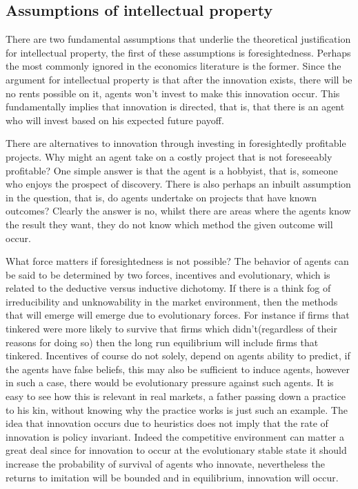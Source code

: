 \documentclass[12pt]{article}
\numberwithin{equation}{section}
\begin{document}
\subsection{Assumptions of intellectual property}


There are two fundamental assumptions that underlie the theoretical justification for intellectual property, the first of these assumptions is foresightedness. Perhaps the most commonly ignored in the economics literature is the former. Since the argument for intellectual property is that after the innovation exists, there will be no rents possible on it, agents won't invest to make this innovation occur. This fundamentally implies that innovation is directed, that is, that there is an agent who will invest based on his expected future payoff.

There are alternatives to innovation through investing in foresightedly profitable projects. Why might an agent take on a costly project that is not foreseeably profitable? One simple answer is that the agent is a hobbyist, that is, someone who enjoys the prospect of discovery. There is also perhaps an inbuilt assumption in the question, that is, do agents undertake on projects that have known outcomes? Clearly the answer is no, whilst there are areas where the agents know the result they want, they do not know which method the given outcome will occur.

What force matters if foresightedness is not possible? The behavior of agents can be said to be determined by two forces, incentives and evolutionary, which is related to the deductive versus inductive dichotomy. If there is a think fog of irreducibility and unknowability in the market environment, then the methods that will emerge will emerge due to evolutionary forces. For instance if firms that tinkered were more likely to survive that firms which didn't(regardless of their reasons for doing so) then the long run equilibrium will include firms that tinkered. Incentives of course do not solely, depend on agents ability to predict, if the agents have false beliefs, this may also be sufficient to induce agents, however in such a case, there would be evolutionary pressure against such agents. It is easy to see how this is relevant in real markets, a father passing down a practice to his kin, without knowing why the practice works is just such an example. The idea that innovation occurs due to heuristics does not imply that the rate of innovation is policy invariant. Indeed the competitive environment can matter a great deal since for innovation to occur at the evolutionary stable state it should increase the probability of survival of agents who innovate, nevertheless the returns to imitation will be bounded and in equilibrium, innovation will occur. \cite{Winter1993}
\end{document}
